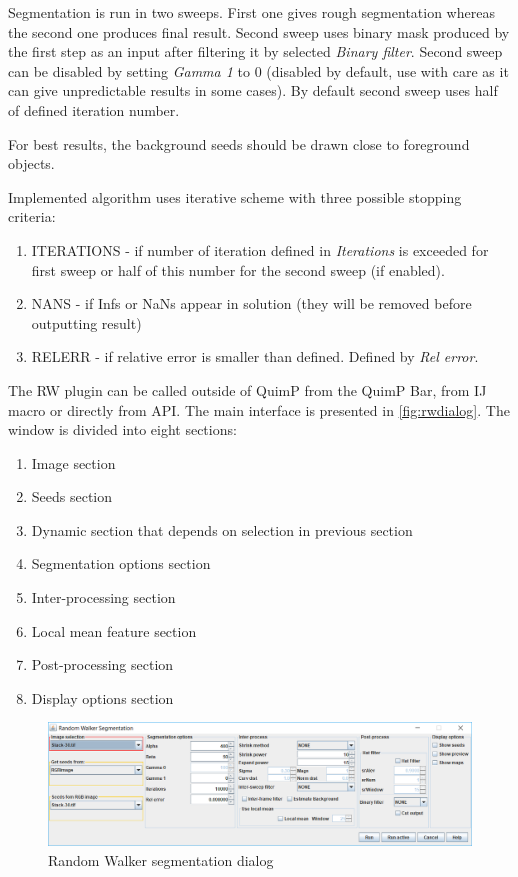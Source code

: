 \documentclass[a4paper,12pt]{article}
\begin{document}
Segmentation is run in two sweeps. First one gives rough segmentation whereas the second one produces final result. Second sweep uses binary mask produced by the first step as an input after filtering it by selected \textit{Binary filter}. Second sweep can be disabled by setting \textit{Gamma 1} to 0 (disabled by default, use with care as it can give unpredictable results in some cases). By default second sweep uses half of defined iteration number.

For best results, the background seeds should be drawn close to foreground objects. 

Implemented algorithm uses iterative scheme with three possible stopping criteria:
\begin{enumerate}
	\item ITERATIONS - if number of iteration defined in \textit{Iterations} is exceeded for first sweep or half of this number for the second sweep (if enabled).
	\item NANS - if Infs or NaNs appear in solution (they will be removed before outputting result)
	\item RELERR - if relative error is smaller than defined. Defined by \textit{Rel error}.
\end{enumerate}

The RW plugin can be called outside of QuimP from the QuimP Bar, from IJ macro or directly from API. The main interface is presented in \autoref{fig:rwdialog}. The window is divided into eight sections:
\begin{enumerate}
	\item Image section
	\item Seeds section
	\item Dynamic section that depends on selection in previous section
	\item Segmentation options section
	\item Inter-processing section
	\item Local mean feature section
	\item Post-processing section
	\item Display options section
\end{enumerate}

\begin{figure}[ht]
	\centering
	\includegraphics[width=18cm]{RandomWalkWindow.png} 
	\caption{Random Walker segmentation dialog}
	\label{fig:rwdialog}
\end{figure}
\end{document}
